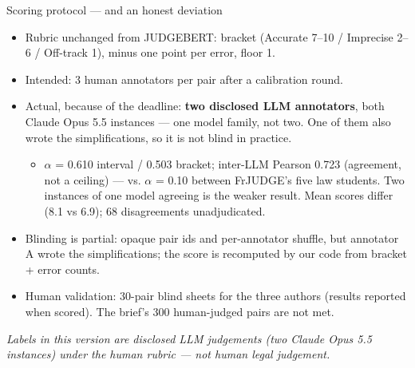 \documentclass[aspectratio=169,11pt]{beamer}
\newcommand{\slidenote}[1]{\vfill\parbox{0.9\textwidth}{\scriptsize\itshape\color{flag}#1}\par}
\begin{document}
\begin{frame}{Scoring protocol — and an honest deviation}
\footnotesize
\begin{itemize}
\item Rubric unchanged from JUDGEBERT: bracket (Accurate 7–10 / Imprecise 2–6 / Off-track 1), minus one point per error, floor 1.
\item Intended: 3 human annotators per pair after a calibration round.
\item Actual, because of the deadline: \textbf{two disclosed LLM annotators}, both Claude Opus 5.5 instances — one model family, not two. One of them also wrote the simplifications, so it is not blind in practice.
\begin{itemize}\footnotesize
\item \ensuremath{\alpha} = 0.610 interval / 0.503 bracket; inter-LLM Pearson 0.723 (agreement, not a ceiling) — vs. \ensuremath{\alpha} = 0.10 between FrJUDGE's five law students. Two instances of one model agreeing is the weaker result. Mean scores differ (8.1 vs 6.9); 68 disagreements unadjudicated.
\end{itemize}
\item Blinding is partial: opaque pair ids and per-annotator shuffle, but annotator A wrote the simplifications; the score is recomputed by our code from bracket + error counts.
\item Human validation: 30-pair blind sheets for the three authors (results reported when scored). The brief's 300 human-judged pairs are not met.
\end{itemize}
\slidenote{Labels in this version are disclosed LLM judgements (two Claude Opus 5.5 instances) under the human rubric — not human legal judgement.}
\end{frame}
\end{document}
